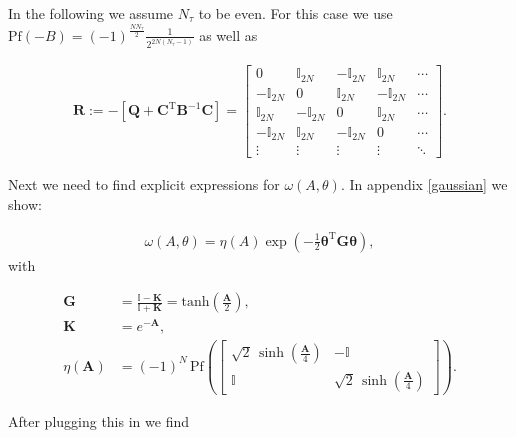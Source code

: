 \documentclass{article}
\begin{document}
In the following we assume $N_{\tau}$ to be even. For this case we use $\mathrm{Pf} \left(-B\right) = \left(-1\right)^\frac{N N_\tau}{2}\frac{1}{2^{2N\left(N_\tau - 1\right) }}$ as well as

\begin{align}
	\boldsymbol{R} := -\left[ \boldsymbol{Q} + \boldsymbol{C}^\mathrm{T} \boldsymbol{B}^{-1} \boldsymbol{C} \right] = \begin{bmatrix}
		0 & \mathbb{I}_{2N} & -\mathbb{I}_{2N} & \mathbb{I}_{2N} & \cdots \\
		-\mathbb{I}_{2N} & 0 & \mathbb{I}_{2N} & -\mathbb{I}_{2N} & \cdots \\
		\mathbb{I}_{2N} & -\mathbb{I}_{2N} & 0 & \mathbb{I}_{2N} & \cdots \\
		-\mathbb{I}_{2N} & \mathbb{I}_{2N} & -\mathbb{I}_{2N} & 0 & \cdots \\
		\vdots & \vdots & \vdots & \vdots & \ddots
	\end{bmatrix}.
\end{align}


Next we need to find explicit expressions for $\omega(A,\theta)$. In appendix \ref{gaussian} we show:

\begin{align}
	\omega \left(A, \theta\right) = \eta(A) \exp \left( -\frac{1}{2}\boldsymbol{\theta}^\mathrm{T} \boldsymbol{G}\boldsymbol{\theta}    \right),
\end{align}
with


\begin{align}
	\boldsymbol{G}
	&= \frac{\mathbb{I} - \boldsymbol{K}}{\mathbb{I} + \boldsymbol{K}} = \mathrm{tanh} \left(\frac{\boldsymbol{A}}{2} \right) , \\[4pt]
	\boldsymbol{K}
	&= e^{-\boldsymbol{A}}, \\[4pt]
	\eta(\boldsymbol{A} )
	&= (-1)^N \,\mathrm{Pf}\!\left(
	\begin{bmatrix}
		\sqrt{2}\,\sinh\!\left(\frac{\boldsymbol{A}}{4}\right) & -\mathbb{I} \\
		\mathbb{I} & \sqrt{2}\,\sinh\!\left(\frac{\boldsymbol{A}}{4}\right)
	\end{bmatrix}
	\right).
\end{align}


After plugging this in we find
\end{document}
